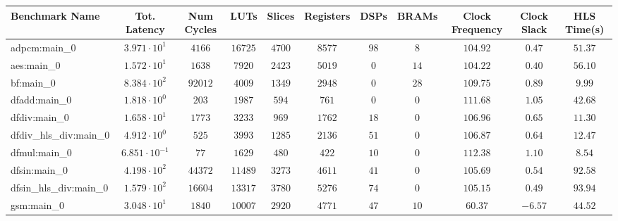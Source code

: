 \begin{tabular}{|l|c|c|c|c|c|c|c|c|c|c|}
\hline
Benchmark Name          & Tot. Latency            & Num Cycles & LUTs       & Slices    & Registers & DSPs    & BRAMs   & Clock Frequency & Clock Slack & HLS Time(s) \\
\hline
adpcm:main\_0           & $ 3.971 \cdot 10^{1}  $ & $ 4166   $ & $ 16725  $ & $ 4700  $ & $ 8577  $ & $ 98  $ & $ 8   $ & $ 104.92      $ & $ 0.47    $ & $ 51.37   $ \\
aes:main\_0             & $ 1.572 \cdot 10^{1}  $ & $ 1638   $ & $ 7920   $ & $ 2423  $ & $ 5019  $ & $ 0   $ & $ 14  $ & $ 104.22      $ & $ 0.40    $ & $ 56.10   $ \\
bf:main\_0              & $ 8.384 \cdot 10^{2}  $ & $ 92012  $ & $ 4009   $ & $ 1349  $ & $ 2948  $ & $ 0   $ & $ 28  $ & $ 109.75      $ & $ 0.89    $ & $ 9.99    $ \\
dfadd:main\_0           & $ 1.818 \cdot 10^{0}  $ & $ 203    $ & $ 1987   $ & $ 594   $ & $ 761   $ & $ 0   $ & $ 0   $ & $ 111.68      $ & $ 1.05    $ & $ 42.68   $ \\
dfdiv:main\_0           & $ 1.658 \cdot 10^{1}  $ & $ 1773   $ & $ 3233   $ & $ 969   $ & $ 1762  $ & $ 18  $ & $ 0   $ & $ 106.96      $ & $ 0.65    $ & $ 11.30   $ \\
dfdiv\_hls\_div:main\_0 & $ 4.912 \cdot 10^{0}  $ & $ 525    $ & $ 3993   $ & $ 1285  $ & $ 2136  $ & $ 51  $ & $ 0   $ & $ 106.87      $ & $ 0.64    $ & $ 12.47   $ \\
dfmul:main\_0           & $ 6.851 \cdot 10^{-1} $ & $ 77     $ & $ 1629   $ & $ 480   $ & $ 422   $ & $ 10  $ & $ 0   $ & $ 112.38      $ & $ 1.10    $ & $ 8.54    $ \\
dfsin:main\_0           & $ 4.198 \cdot 10^{2}  $ & $ 44372  $ & $ 11489  $ & $ 3273  $ & $ 4611  $ & $ 41  $ & $ 0   $ & $ 105.69      $ & $ 0.54    $ & $ 92.58   $ \\
dfsin\_hls\_div:main\_0 & $ 1.579 \cdot 10^{2}  $ & $ 16604  $ & $ 13317  $ & $ 3780  $ & $ 5276  $ & $ 74  $ & $ 0   $ & $ 105.15      $ & $ 0.49    $ & $ 93.94   $ \\
gsm:main\_0             & $ 3.048 \cdot 10^{1}  $ & $ 1840   $ & $ 10007  $ & $ 2920  $ & $ 4771  $ & $ 47  $ & $ 10  $ & $ 60.37       $ & $ -6.57   $ & $ 44.52   $ \\

\end{tabular}
